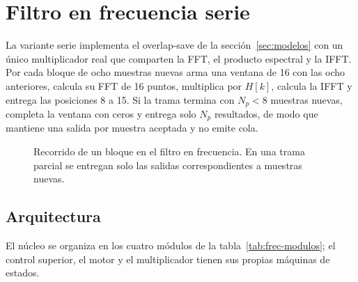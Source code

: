 \section{Filtro en frecuencia serie}\label{sec:frecuencia}

La variante serie implementa el overlap-save de la sección~\ref{sec:modelos} con un único multiplicador real que comparten la FFT, el producto espectral y la IFFT. Por cada bloque de ocho muestras nuevas arma una ventana de 16 con las ocho anteriores, calcula su FFT de 16 puntos, multiplica por $H[k]$, calcula la IFFT y entrega las posiciones 8 a 15. Si la trama termina con $N_p < 8$ muestras nuevas, completa la ventana con ceros y entrega solo $N_p$ resultados, de modo que mantiene una salida por muestra aceptada y no emite cola.

\begin{figure}[ht]
  \centering
  \caption{Recorrido de un bloque en el filtro en frecuencia. En una trama parcial se entregan solo las salidas correspondientes a muestras nuevas.}
  \label{fig:frec-recorrido}
\end{figure}

\subsection{Arquitectura}

El núcleo se organiza en los cuatro módulos de la tabla~\ref{tab:frec-modulos}; el control superior, el motor y el multiplicador tienen sus propias máquinas de estados.

